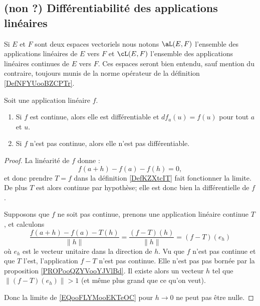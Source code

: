 \subsection{(non ?) Différentiabilité des applications linéaires}

Si \( E\) et \( F\) sont deux espaces vectoriels nous notons \( \aL(E,F)\) l'ensemble des applications linéaires de \( E\) vers \( F\) et \( \cL(E,F)\) l'ensemble des applications linéaires continues de \( E\) vers \( F\). Ces espaces seront bien entendu, sauf mention du contraire, toujours munis de la norme opérateur de la définition \ref{DefNFYUooBZCPTr}. 

\begin{lemma}       \label{LemooXXUGooUqCjmp}
    Soit une application linéaire \( f\). 
    \begin{enumerate}
        \item
            Si \( f\) est continue, alors elle est différentiable et \( df_a(u)=f(u)\) pour tout \( a\) et \( u\).
        \item 
            Si \( f\) n'est pas continue, alors elle n'est pas différentiable.
    \end{enumerate}
\end{lemma}

\begin{proof}
    La linéarité de \( f\) donne :
    \begin{equation}
        f(a+h)-f(a)-f(h)=0,
    \end{equation}
    et donc prendre \( T=f\) dans la définition \ref{DefKZXtcIT} fait fonctionner la limite. De plus \( T\) est alors continue par hypothèse; elle est donc bien la différentielle de \( f\).

    Supposons que \( f\) ne soit pas continue, prenons une application linéaire continue \( T\), et calculons
    \begin{equation}        \label{EQooFLYMooEKTeOC}
        \frac{ f(a+h)-f(a)-T(h) }{ \| h \| }=\frac{ (f-T)(h) }{ \| h \| }=(f-T)(e_h)
    \end{equation}
    où \( e_h\) est le vecteur unitaire dans la direction de \( h\). Vu que \( f\) n'est pas continue et que \( T\) l'est, l'application \( f-T\) n'est pas continue. Elle n'est pas pas bornée par la proposition \ref{PROPooQZYVooYJVlBd}. Il existe alors un vecteur \( h\) tel que \( \| (f-T)(e_h) \|>1\) (et même plus grand que ce qu'on veut).

    Donc la limite de \eqref{EQooFLYMooEKTeOC} pour \( h\to 0\) ne peut pas être nulle.
\end{proof}

